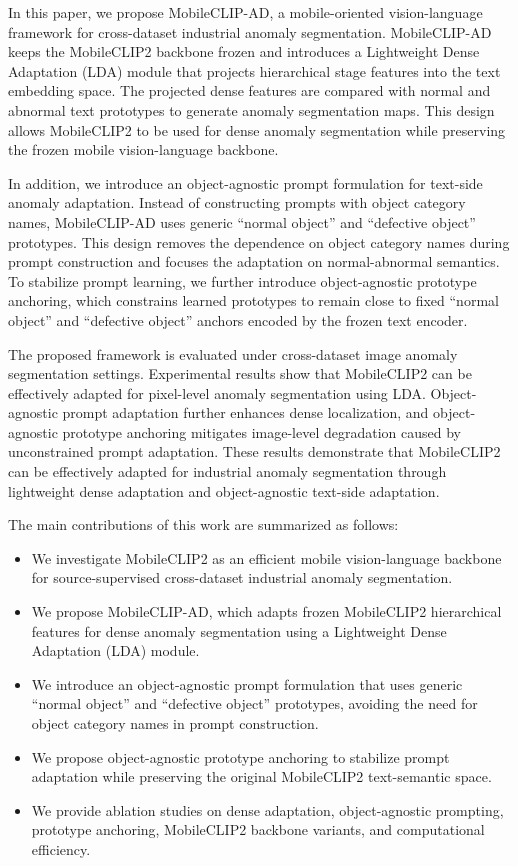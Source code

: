 \documentclass[10pt]{article}
\begin{document}
In this paper, we propose MobileCLIP-AD, a mobile-oriented vision-language framework for cross-dataset industrial anomaly segmentation. MobileCLIP-AD keeps the MobileCLIP2 backbone frozen and introduces a Lightweight Dense Adaptation (LDA) module that projects hierarchical stage features into the text embedding space. The projected dense features are compared with normal and abnormal text prototypes to generate anomaly segmentation maps. This design allows MobileCLIP2 to be used for dense anomaly segmentation while preserving the frozen mobile vision-language backbone.

In addition, we introduce an object-agnostic prompt formulation for text-side anomaly adaptation. Instead of constructing prompts with object category names, MobileCLIP-AD uses generic ``normal object'' and ``defective object'' prototypes. This design removes the dependence on object category names during prompt construction and focuses the adaptation on normal-abnormal semantics. To stabilize prompt learning, we further introduce object-agnostic prototype anchoring, which constrains learned prototypes to remain close to fixed ``normal object'' and ``defective object'' anchors encoded by the frozen text encoder.

The proposed framework is evaluated under cross-dataset image anomaly segmentation settings. Experimental results show that MobileCLIP2 can be effectively adapted for pixel-level anomaly segmentation using LDA. Object-agnostic prompt adaptation further enhances dense localization, and object-agnostic prototype anchoring mitigates image-level degradation caused by unconstrained prompt adaptation. These results demonstrate that MobileCLIP2 can be effectively adapted for industrial anomaly segmentation through lightweight dense adaptation and object-agnostic text-side adaptation.

The main contributions of this work are summarized as follows:
\begin{itemize}
    \item We investigate MobileCLIP2 as an efficient mobile vision-language backbone for source-supervised cross-dataset industrial anomaly segmentation.
    \item We propose MobileCLIP-AD, which adapts frozen MobileCLIP2 hierarchical features for dense anomaly segmentation using a Lightweight Dense Adaptation (LDA) module.
    \item We introduce an object-agnostic prompt formulation that uses generic ``normal object'' and ``defective object'' prototypes, avoiding the need for object category names in prompt construction.
    \item We propose object-agnostic prototype anchoring to stabilize prompt adaptation while preserving the original MobileCLIP2 text-semantic space.
    \item We provide ablation studies on dense adaptation, object-agnostic prompting, prototype anchoring, MobileCLIP2 backbone variants, and computational efficiency.
\end{itemize}
\end{document}
